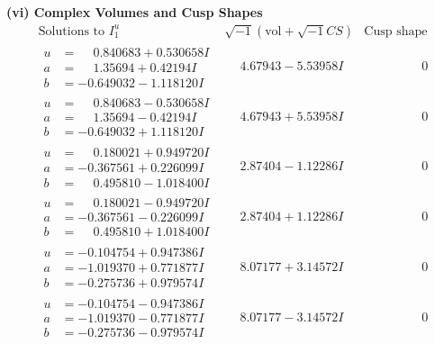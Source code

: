 \documentclass[1p]{elsarticle_modified}
\theoremstyle{definition}
\newcommand{\I}{\sqrt{-1}}
\begin{document}
\newpage\flushleft \textbf{(vi) Complex Volumes and Cusp Shapes}
$$\begin{array}{c|c|c}  
\text{Solutions to }I^u_{1}& \I (\text{vol} + \sqrt{-1}CS) & \text{Cusp shape}\\
 \hline 
\begin{aligned}
u &= \phantom{-}0.840683 + 0.530658 I \\
a &= \phantom{-}1.35694 + 0.42194 I \\
b &= -0.649032 - 1.118120 I\end{aligned}
 & \phantom{-}4.67943 - 5.53958 I & \phantom{-0.000000 } 0 \\ \hline\begin{aligned}
u &= \phantom{-}0.840683 - 0.530658 I \\
a &= \phantom{-}1.35694 - 0.42194 I \\
b &= -0.649032 + 1.118120 I\end{aligned}
 & \phantom{-}4.67943 + 5.53958 I & \phantom{-0.000000 } 0 \\ \hline\begin{aligned}
u &= \phantom{-}0.180021 + 0.949720 I \\
a &= -0.367561 + 0.226099 I \\
b &= \phantom{-}0.495810 - 1.018400 I\end{aligned}
 & \phantom{-}2.87404 - 1.12286 I & \phantom{-0.000000 } 0 \\ \hline\begin{aligned}
u &= \phantom{-}0.180021 - 0.949720 I \\
a &= -0.367561 - 0.226099 I \\
b &= \phantom{-}0.495810 + 1.018400 I\end{aligned}
 & \phantom{-}2.87404 + 1.12286 I & \phantom{-0.000000 } 0 \\ \hline\begin{aligned}
u &= -0.104754 + 0.947386 I \\
a &= -1.019370 + 0.771877 I \\
b &= -0.275736 + 0.979574 I\end{aligned}
 & \phantom{-}8.07177 + 3.14572 I & \phantom{-0.000000 } 0 \\ \hline\begin{aligned}
u &= -0.104754 - 0.947386 I \\
a &= -1.019370 - 0.771877 I \\
b &= -0.275736 - 0.979574 I\end{aligned}
 & \phantom{-}8.07177 - 3.14572 I & \phantom{-0.000000 } 0 \\ \hline\begin{aligned}

\end{aligned}
\end{array}$$
\end{document}
